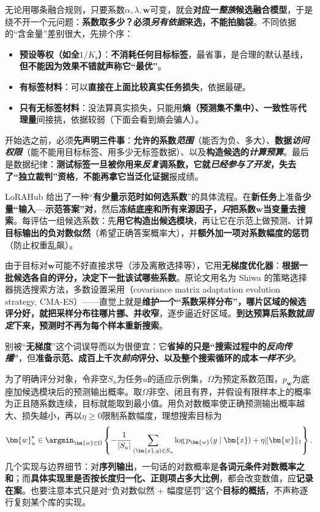无论用哪条融合规则，只要系数$\alpha,\lambda,\bm{w}$可变，就会\textbf{对应一\emph{整族}候选融合模型}，于是绕不开一个元问题：\textbf{系数取多少？必须\emph{另有依据}来选，不能拍脑袋}。不同依据的“含金量”差别很大，先排个序：
\begin{itemize}\item \textbf{预设等权（如全$1/K_{\mathrm{s}}$）}：\textbf{不消耗任何目标标签}，最省事，是合理的默认基线，\textbf{但不能因为效果不错就声称它“最优”}。\item \textbf{有标签材料}：可以\textbf{直接在上面比较真实任务损失}，依据最硬。\item \textbf{只有无标签材料}：没法算真实损失，只能用\textbf{熵（预测集不集中）、一致性}等\textbf{代理量}间接挑，依据较弱（下面会看到熵会骗人）。\end{itemize}
开始选之前，必须\textbf{先声明三件事}：\textbf{允许的系数\emph{范围}}（能否为负、多大）、\textbf{数据\emph{访问权限}}（能不能用目标标签、用多少无标签数据）、以及\textbf{构造候选的\emph{计算预算}}。最后是数据纪律：\textbf{测试标签一旦被你用来\emph{反复}调系数，它就\emph{已经参与了开发}，失去了“独立裁判”资格}，\textbf{不能再拿它当泛化证据}报成绩。

LoRAHub 给出了一种“\textbf{有少量示范时如何选系数}”的具体流程。在\textbf{新任务}上准备\textbf{少量“输入—示范答案”对}，然后\textbf{冻结底座和所有来源因子，\emph{只}把系数$\bm{w}$当变量去搜索}。每评估一组候选系数：先\textbf{用它构造出候选模块}，再让它在示范上做预测、计算\textbf{目标输出的负对数似然}（希望正确答案概率大），并\textbf{额外加一项对系数幅度的惩罚}（防止权重乱飙）。

由于目标对$\bm{w}$可能不好直接求导（涉及离散选择等），它用\textbf{无梯度优化器}：\textbf{根据一批候选各自的评分，决定下一批该试哪些系数}。原论文用名为 Shiwa 的策略选择器挑选搜索方法，多数设置采用（covariance matrix adaptation evolution strategy, CMA-ES）——直觉上就是\textbf{维护一个“系数采样分布”，哪片区域的候选评分好，就把采样分布往哪片挪、并收窄}，逐步逼近好区域。\textbf{到达预算后系数就\emph{固定}下来，预测时不再为每个样本重新搜索}。

别被“\textbf{无梯度}”这个词误导而以为很便宜：它\textbf{省掉的只是“搜索过程中的\emph{反向传播}”}，但\textbf{准备示范、成百上千次\emph{前向}评分、以及整个搜索循环的成本\emph{一样不少}}。

为了明确评分对象，令非空$S_u$为任务$u$的适应示例集，$\Omega$为预定系数范围，$p_{\bm{w}}$为底座加候选模块后的预测输出概率。取$\Omega$非空、闭且有界，并假设有限样本上的概率为正且随系数连续，目标就能取到最小值。用负对数概率使正确预测输出概率越大、损失越小，再以$\eta\geq0$限制系数幅度，理想搜索目标为
\begin{equation}
  \bm{w}_u^\star\in\argmin_{\bm{w}\in\Omega}
   \left\{-\frac{1}{|S_u|}
   \sum_{(\bm{x},y)\in S_u}\log p_{\bm{w}}(y\mid\bm{x})
   +\eta\lVert\bm{w}\rVert_1\right\}.
  \label{eq:ket-integration-lorahub-search}
\end{equation}
几个实现与边界细节：对\textbf{序列输出}，一句话的对数概率是\textbf{各词元条件对数概率之和}；而\textbf{具体实现里是否按长度归一化、正则项占多大比例}，都会改变数值，应\textbf{记录在案}。也要注意本式只是对“负对数似然 + 幅度惩罚”这个\textbf{目标的概括}，不声称逐行复刻某个库的实现。

